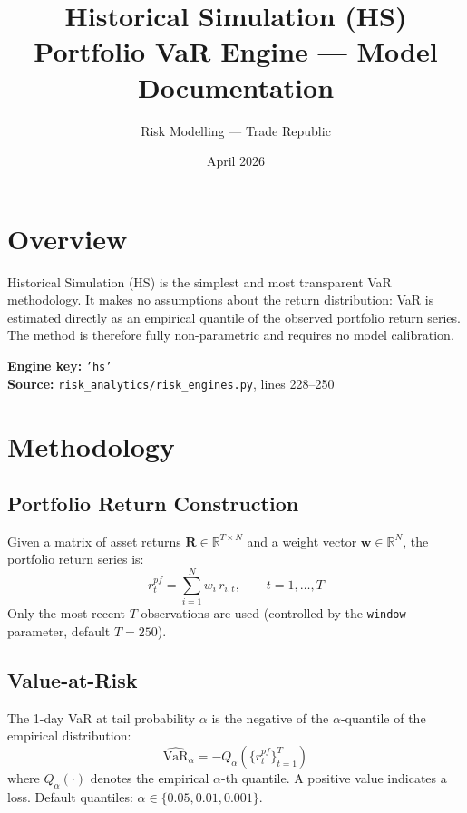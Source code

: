 \documentclass[11pt, a4paper]{article}
\title{\textbf{Historical Simulation (HS)}\\[4pt]
\large Portfolio VaR Engine --- Model Documentation}
\author{Risk Modelling --- Trade Republic}
\date{April 2026}
\begin{document}
\maketitle

\section{Overview}

Historical Simulation (HS) is the simplest and most transparent VaR
methodology. It makes no assumptions about the return distribution: VaR
is estimated directly as an empirical quantile of the observed portfolio
return series. The method is therefore fully non-parametric and requires
no model calibration.

\textbf{Engine key:} \texttt{'hs'} \\
\textbf{Source:} \texttt{risk\_analytics/risk\_engines.py}, lines 228--250

\section{Methodology}

\subsection{Portfolio Return Construction}

Given a matrix of asset returns $\mathbf{R} \in \mathbb{R}^{T \times N}$
and a weight vector $\mathbf{w} \in \mathbb{R}^N$, the portfolio return
series is:
\begin{equation}
r_t^{pf} = \sum_{i=1}^{N} w_i \, r_{i,t}, \qquad t = 1, \ldots, T
\end{equation}
Only the most recent $T$ observations are used (controlled by the
\texttt{window} parameter, default $T = 250$).

\subsection{Value-at-Risk}

The 1-day VaR at tail probability $\alpha$ is the negative of the
$\alpha$-quantile of the empirical distribution:
\begin{equation}
\widehat{\text{VaR}}_\alpha = -Q_\alpha\!\left(\{r_t^{pf}\}_{t=1}^T\right)
\end{equation}
where $Q_\alpha(\cdot)$ denotes the empirical $\alpha$-th quantile.
A positive value indicates a loss. Default quantiles:
$\alpha \in \{0.05, 0.01, 0.001\}$.
\end{document}
